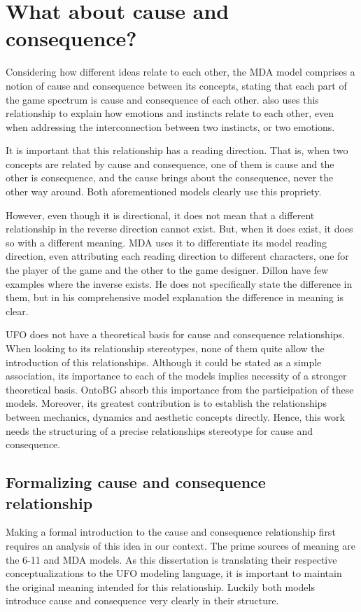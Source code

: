 \section{What about cause and consequence?}

Considering how different ideas relate to each other, the MDA model comprises a notion of cause and consequence between its concepts, stating that each part of the game spectrum is cause and consequence of each other. \citet{dillon_way_2010} also uses this relationship to explain how emotions and instincts relate to each other, even when addressing the interconnection between two instincts, or two emotions.

It is important that this relationship has a reading direction. That is, when two concepts are related by cause and consequence, one of them is cause and the other is consequence, and the cause brings about the consequence, never the other way around. Both aforementioned models clearly use this propriety. 

However, even though it is directional, it does not mean that a different relationship in the reverse direction cannot exist. But, when it does exist, it does so with a different meaning. MDA uses it to differentiate its model reading direction, even attributing each reading direction to different characters, one for the player of the game and the other to the game designer. Dillon have few examples where the inverse exists. He does not specifically state the difference in them, but in his comprehensive model explanation the difference in meaning is clear.

UFO does not have a theoretical basis for cause and consequence relationships. When looking to its relationship stereotypes, none of them quite allow the introduction of this relationships. Although it could be stated as a simple association, its importance to each of the models implies necessity of a stronger theoretical basis. OntoBG absorb this importance from the participation of these models. Moreover, its greatest contribution is to establish the relationships between mechanics, dynamics and aesthetic concepts directly. Hence, this work needs the structuring of a precise relationships stereotype for cause and consequence.

\subsection{Formalizing cause and consequence relationship}


Making a formal introduction to the cause and consequence relationship first requires an analysis of this idea in our context. The prime sources of meaning are the 6-11 and MDA models. As this dissertation is translating their respective conceptualizations to the UFO modeling language, it is important to maintain the original meaning intended for this relationship. Luckily both models introduce cause and consequence very clearly in their structure. 

